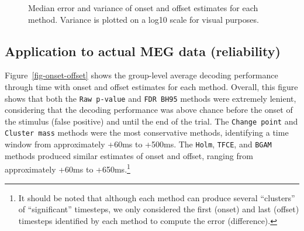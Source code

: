 \documentclass[
  doc,
  floatsintext,
  longtable,
  a4paper,
  nolmodern,
  notxfonts,
  notimes,
  colorlinks=true,linkcolor=blue,citecolor=blue,urlcolor=blue]{apa7}
\begin{document}
\begin{figure}[!htb]

\caption{\label{fig-simulation-mae-variance}Median error and variance of
onset and offset estimates for each method. Variance is plotted on a
log10 scale for visual purposes.}


\end{figure}%

\newpage

\subsection{Application to actual MEG data
(reliability)}\label{application-to-actual-meg-data-reliability}

Figure~\ref{fig-onset-offset} shows the group-level average decoding
performance through time with onset and offset estimates for each
method. Overall, this figure shows that both the \texttt{Raw\ p-value}
and \texttt{FDR\ BH95} methods were extremely lenient, considering that
the decoding performance was above chance before the onset of the
stimulus (false positive) and until the end of the trial. The
\texttt{Change\ point} and \texttt{Cluster\ mass} methods were the most
conservative methods, identifying a time window from approximately +60ms
to +500ms. The \texttt{Holm}, \texttt{TFCE}, and \texttt{BGAM} methods
produced similar estimates of onset and offset, ranging from
approximately +60ms to +650ms.\footnote{It should be noted that although
  each method can produce several ``clusters'' of ``significant''
  timesteps, we only considered the first (onset) and last (offset)
  timesteps identified by each method to compute the error (difference).}
\end{document}
